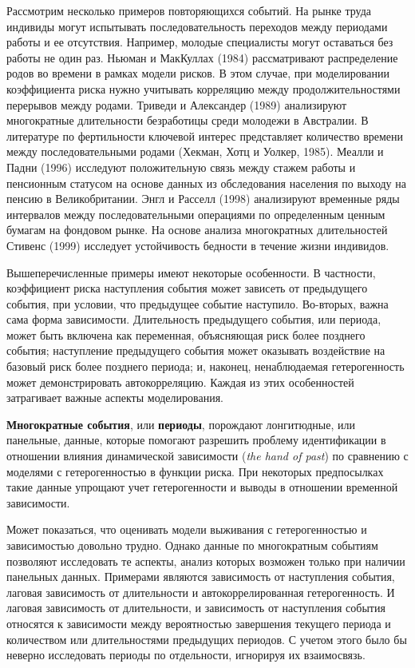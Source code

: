 Рассмотрим несколько примеров повторяющихся событий. На рынке труда индивиды могут испытывать последовательность переходов между периодами работы и ее отсутствия. Например, молодые специалисты могут оставаться без работы не один раз. Ньюман и МакКуллах (1984) рассматривают распределение родов во времени в рамках модели рисков. В этом случае, при моделировании коэффициента риска нужно учитывать корреляцию между продолжительностями перерывов между родами. Триведи и Александер (1989) анализируют многократные длительности безработицы среди молодежи в Австралии. В литературе по фертильности ключевой интерес представляет количество времени между последовательными родами (Хекман, Хотц и Уолкер, 1985). Меалли и Падни (1996) исследуют положительную связь между стажем работы и пенсионным статусом на основе данных из обследования населения по выходу на пенсию в Великобритании. Энгл и Расселл (1998) анализируют временные ряды интервалов между последовательными операциями по определенным ценным бумагам на фондовом рынке. На основе анализа многократных длительностей Стивенс (1999) исследует устойчивость бедности в течение жизни индивидов.

Вышеперечисленные примеры имеют некоторые особенности. В частности, коэффициент риска наступления события может зависеть от предыдущего события, при условии, что предыдущее событие наступило. Во-вторых, важна сама форма зависимости. Длительность предыдущего события, или периода, может быть включена как переменная, объясняющая риск более позднего события; наступление предыдущего события может оказывать воздействие на базовый риск более позднего периода; и, наконец, ненаблюдаемая гетерогенность может демонстрировать автокорреляцию.
Каждая из этих особенностей затрагивает важные аспекты моделирования.

\textbf{Многократные события}, или \textbf{периоды}, порождают лонгитюдные, или панельные, данные, которые помогают разрешить проблему идентификации в отношении влияния динамической зависимости (\textit{the hand of past}) по сравнению с моделями с гетерогенностью в функции риска. При некоторых предпосылках такие данные упрощают учет гетерогенности и выводы в отношении временной зависимости.

Может показаться, что оценивать модели выживания с гетерогенностью и зависимостью довольно трудно. Однако данные по многократным событиям позволяют исследовать те аспекты, анализ которых возможен только при наличии панельных данных. Примерами являются зависимость от наступления события, лаговая зависимость от длительности и автокоррелированная гетерогенность. И лаговая зависимость от длительности, и зависимость от наступления события относятся к зависимости между вероятностью завершения текущего периода и количеством или длительностями предыдущих периодов. С учетом этого было бы неверно исследовать периоды по отдельности, игнорируя их взаимосвязь.

